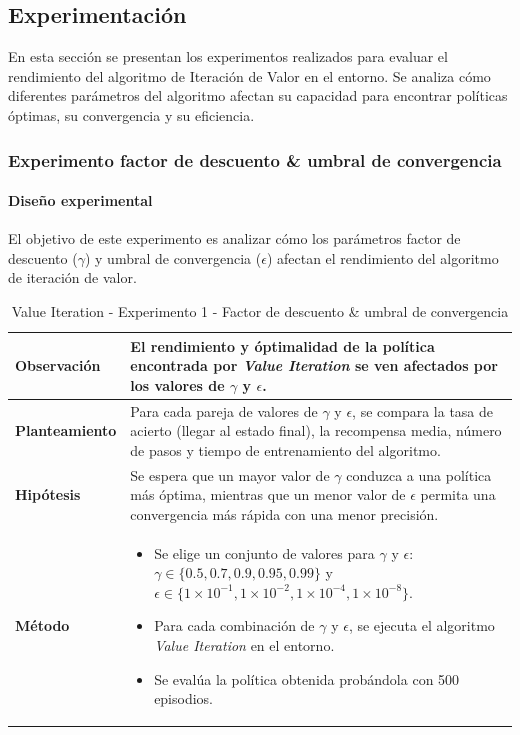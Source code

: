 \subsection{Experimentación}

En esta sección se presentan los experimentos realizados para evaluar el rendimiento del algoritmo de Iteración de Valor en el entorno. Se analiza cómo diferentes parámetros del algoritmo afectan su capacidad para encontrar políticas óptimas, su convergencia y su eficiencia.

\subsubsection{Experimento factor de descuento \& umbral de convergencia}

\paragraph{Diseño experimental}
El objetivo de este experimento es analizar cómo los parámetros factor de descuento (\(\gamma\)) y umbral de convergencia (\(\epsilon\)) afectan el rendimiento del algoritmo de iteración de valor.

\begin{table}[H]
    \centering
    \begin{tabularx}{\textwidth}{|p{4cm}|X|} %
        \hline %
        \textbf{Observación} & El rendimiento y óptimalidad de la política encontrada por \textit{Value Iteration} se ven afectados por los valores de $\gamma$ y $\epsilon$.
        \\ \hline
        \textbf{Planteamiento} & Para cada pareja de valores de $\gamma$ y $\epsilon$, se compara la tasa de acierto (llegar al estado final), la recompensa media, número de pasos y tiempo de entrenamiento del algoritmo.
        \\ \hline
        \textbf{Hipótesis} & Se espera que un mayor valor de $\gamma$ conduzca a una política más óptima, mientras que un menor valor de $\epsilon$ permita una convergencia más rápida con una menor precisión.
        \\ \hline
        \textbf{Método} & 
        \begin{itemize}
            \item Se elige un conjunto de valores para $\gamma$ y $\epsilon$: \(\gamma \in \{0.5, 0.7, 0.9, 0.95, 0.99\}\) y \(\epsilon \in \{1\times 10^{-1}, 1\times 10^{-2}, 1\times 10^{-4}, 1\times 10^{-8}\}\).
            \item Para cada combinación de \(\gamma\) y \(\epsilon\), se ejecuta el algoritmo \textit{Value Iteration} en el entorno.
            \item Se evalúa la política obtenida probándola con 500 episodios.
        \end{itemize}
        \\ \hline
    \end{tabularx}
    \caption{Value Iteration - Experimento 1 - Factor de descuento \& umbral de convergencia}
    \label{tab:diseñoValueIterationExp1}
\end{table}

